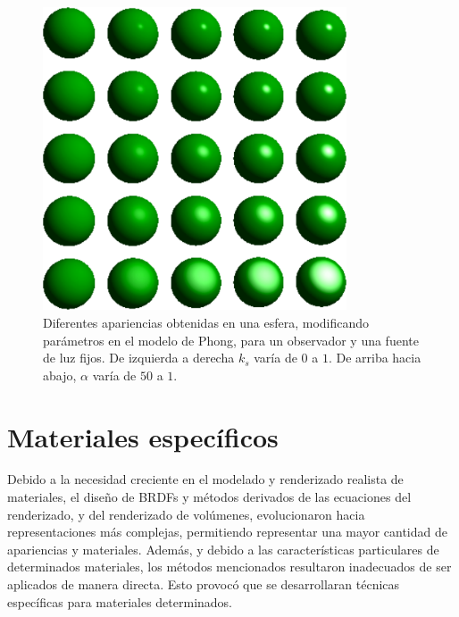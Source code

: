 \begin{figure}
\center
\includegraphics[width=9cm]{figures/phongparametros}
\caption[Diferentes apariencias en el modelo de Phong]{Diferentes apariencias obtenidas en una esfera, modificando parámetros en el modelo de Phong, para un observador y una fuente de luz fijos. De izquierda a derecha $k_{s}$ varía de $0$ a $1$. De arriba hacia abajo, $\alpha$ varía de $50$ a $1$.}
\label{fg:phongparametros}
\end{figure}



\section{Materiales específicos}
Debido a la necesidad creciente en el modelado y renderizado realista de materiales, el diseño de BRDFs y métodos derivados de las ecuaciones del renderizado, y del renderizado de volúmenes, evolucionaron hacia representaciones más complejas, permitiendo representar una mayor cantidad de apariencias y materiales.
Además, y debido a las características particulares de determinados materiales, los métodos mencionados resultaron inadecuados de ser aplicados de manera directa.
Esto provocó que se desarrollaran técnicas específicas para materiales determinados.

